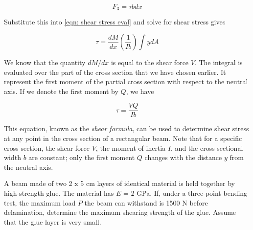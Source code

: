 \documentclass[
10pt,
a4paper,
openany,
svgnames,
]{book} %
\begin{document}
\[F_3 = \tau bdx\]

Substitute this into \cref{eqn: shear stress eval} and solve for shear stress gives

\[\tau  = \frac{dM}{dx}\left( {\frac{1}{Ib}} \right) \int ydA \]

We know that the quantity $dM/dx$ is equal to the shear force $V$. The integral is evaluated over the part of the cross section that we have chosen earlier. It represent the first moment of the partial cross section with respect to the neutral axis. If we denote the first moment by $Q$, we have

\begin{equation}
  \tau  = \frac{VQ}{Ib}
\end{equation}

This equation, known as the \emph{shear formula}, can be used to determine shear stress at any point in the cross section of a rectangular beam. Note that for a specific cross section, the shear force $V$, the moment of inertia $I$, and the cross-sectional width $b$ are constant; only the first moment $Q$ changes with the distance $y$ from the neutral axis.

\begin{example}
  A beam made of two 2 x 5 cm layers of identical material is held together by high-strength glue. The material has $E$ = 2 GPa. If, under a three-point bending test, the maximum load $P$ the beam can withstand is 1500 N before delamination, determine the maximum shearing strength of the glue. Assume that the glue layer is very small.

  \begin{figure}[H]
    \centering
  \end{figure}
  
\end{example}
\end{document}

